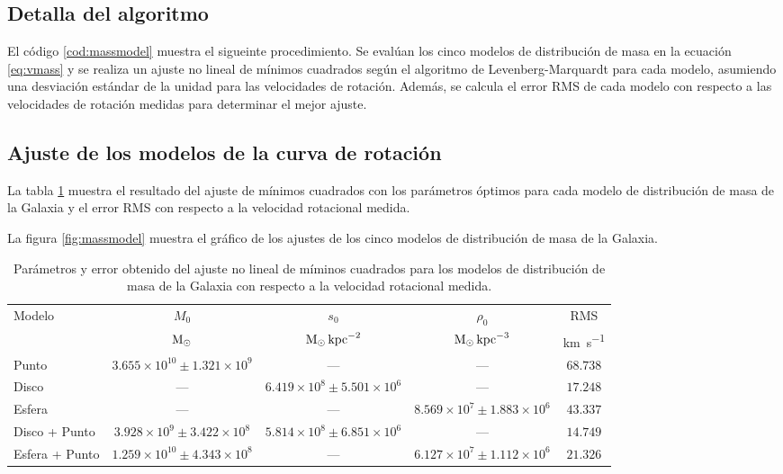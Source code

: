 \subsection{Detalla del algoritmo}

El código \ref{cod:massmodel} muestra el sigueinte procedimiento. Se evalúan los cinco modelos de distribución de masa en la ecuación \ref{eq:vmass} y se realiza un ajuste no lineal de mínimos cuadrados según el algoritmo de Levenberg-Marquardt para cada modelo, asumiendo una desviación estándar de la unidad para las velocidades de rotación. Además, se calcula el error RMS de cada modelo con respecto a las velocidades de rotación medidas para determinar el mejor ajuste.

\subsection{Ajuste de los modelos de la curva de rotación}

La tabla \ref{tab:massmodel} muestra el resultado del ajuste de mínimos cuadrados con los parámetros óptimos para cada modelo de distribución de masa de la Galaxia y el error RMS con respecto a la velocidad rotacional medida.

La figura \ref{fig:massmodel} muestra el gráfico de los ajustes de los cinco modelos de distribución de masa de la Galaxia.

\begin{table}[htpb]
	\centering
	\begin{tabular}{lcccc}
		\toprule
		{Modelo} &
		{$M_0$} &
		{$s_0$} &
		{$\rho_0$} &
		{RMS} \\
		{} &
		{$\textnormal{M}_\odot$} &
		{$\textnormal{M}_\odot\,\textnormal{kpc}^{-2}$} &
		{$\textnormal{M}_\odot\,\textnormal{kpc}^{-3}$} &
		{\si{\kilo\meter\per\second}} \\
		\midrule
		Punto & $3.655\times10^{10}\pm1.321\times10^{9}$ & --- & --- & $68.738$ \\
		Disco & --- & $6.419\times10^{8}\pm5.501\times10^{6}$ & --- & $17.248$ \\
		Esfera & --- & --- & $8.569\times10^{7}\pm1.883\times10^6$ & $43.337$ \\
		Disco + Punto & $3.928\times10^{9}\pm3.422\times10^{8}$ & $5.814\times10^{8}\pm6.851\times10^{6}$ & --- & $14.749$ \\
		Esfera + Punto & $1.259\times10^{10}\pm4.343\times10^{8}$ & --- & $6.127\times10^{7}\pm1.112\times10^{6}$ & $21.326$ \\
		\bottomrule
	\end{tabular}
	\caption{Parámetros y error obtenido del ajuste no lineal de míminos cuadrados para los modelos de distribución de masa de la Galaxia con respecto a la velocidad rotacional medida.}\label{tab:massmodel}
\end{table}

